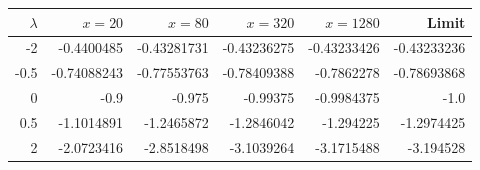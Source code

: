 \begin{tabular}{r r r r r r}
\toprule
$\lambda$ & $x=20$ & $x=80$ & $x=320$ & $x=1280$ & Limit\\
\midrule
-2 & -0.4400485 & -0.43281731 & -0.43236275 & -0.43233426 & -0.43233236\\
-0.5 & -0.74088243 & -0.77553763 & -0.78409388 & -0.7862278 & -0.78693868\\
0 & -0.9 & -0.975 & -0.99375 & -0.9984375 & -1.0\\
0.5 & -1.1014891 & -1.2465872 & -1.2846042 & -1.294225 & -1.2974425\\
2 & -2.0723416 & -2.8518498 & -3.1039264 & -3.1715488 & -3.194528\\
\bottomrule
\end{tabular}

